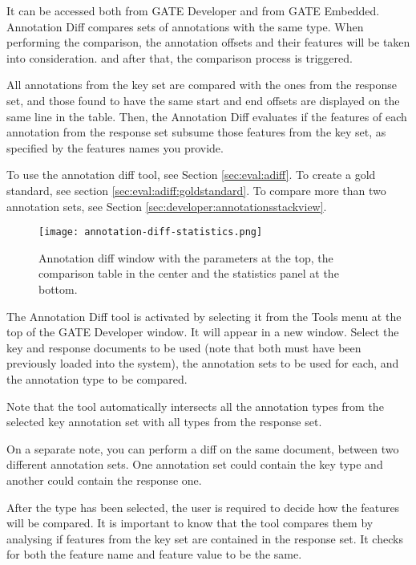It can be accessed both from GATE Developer and from GATE Embedded.
Annotation Diff compares sets of annotations with the same type. When
performing the comparison, the annotation offsets and their features will be
taken into consideration. and after that, the comparison process is
triggered.

All annotations from the key set are compared with the ones from
the response set, and those found to have the same start and end
offsets are displayed on the same line in the table. Then, the
Annotation Diff evaluates if the features of each annotation from
the response set subsume those features from the key set, as
specified by the features names you provide.

To use the annotation diff tool, see Section \ref{sec:eval:adiff}. To create
a gold standard, see section \ref{sec:eval:adiff:goldstandard}. To compare
more than two annotation sets, see Section
\ref{sec:developer:annotationsstackview}.


\begin{figure}[htbp]
\begin{center}
\texttt{[image: annotation-diff-statistics.png]}
\end{center}
\caption{Annotation diff window with the parameters at the top,
the comparison table in the center and the statistics panel at the
bottom.}
\label{fig:annotdiff}
\end{figure}

The Annotation Diff tool is activated by selecting it from the Tools menu
at the top of the GATE Developer window. It will appear in a new
window.  Select the key and response documents to be used (note that
both must have been previously loaded into the system), the annotation
sets to be used for each, and the annotation type to be compared.

Note that the tool automatically intersects all the annotation
types from the selected key annotation set with all types from the
response set.

On a separate note, you can perform a diff on the same document,
between two different annotation sets. One annotation set could
contain the key type and another could contain the response one.

After the type has been selected, the user is required to decide
how the features will be compared. It is important to know that
the tool compares them by analysing if features from the key set
are contained in the response set. It checks for both the feature
name and feature value to be the same.

